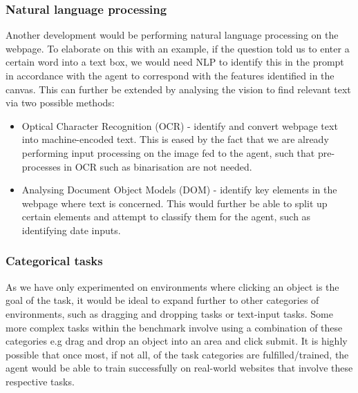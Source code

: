 \documentclass[10pt,journal,compsoc]{IEEEtran}
\begin{document}
\subsubsection{Natural language processing}
Another development would be performing natural language processing on the webpage. To elaborate on this with an example, if the question told us to enter a certain word into a text box, we would need NLP to identify this in the prompt in accordance with the agent to correspond with the features identified in the canvas. This can further be extended by analysing the vision to find relevant text via two possible methods:
\indent
\begin{itemize}
\item Optical Character Recognition (OCR) - identify and convert webpage text into machine-encoded text. This is eased by the fact that we are already performing input processing on the image fed to the agent, such that pre-processes in OCR such as binarisation are not needed. 
\item Analysing Document Object Models (DOM) - identify key elements in the webpage where text is concerned. This would further be able to split up certain elements and attempt to classify them for the agent, such as identifying date inputs.
\end{itemize}

\subsubsection{Categorical tasks}
As we have only experimented on environments where clicking an object is the goal of the task, it would be ideal to expand further to other categories of environments, such as dragging and dropping tasks or text-input tasks. Some more complex tasks within the benchmark involve using a combination of these categories e.g drag and drop an object into an area and click submit. It is highly possible that once most, if not all, of the task categories are fulfilled/trained, the agent would be able to train successfully on real-world websites that involve these respective tasks.



\end{document}
